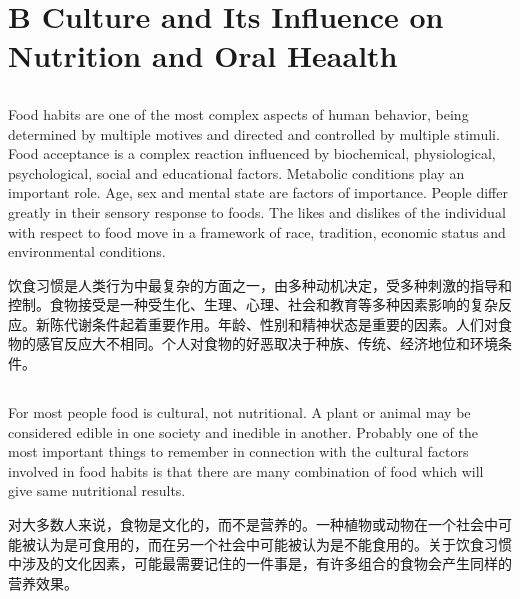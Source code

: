 \documentclass[]{article}
\begin{document}
\section{B Culture and Its Influence on Nutrition and Oral Heaalth}
\subsection{}
\begin{spacing}{2.0}
	{\Large Food habits are one of the most complex aspects of human behavior, being determined by multiple motives and directed and controlled by multiple stimuli. Food acceptance is a complex reaction influenced by biochemical, physiological, psychological, social and educational factors. Metabolic conditions play an important role. Age, sex and mental state are factors of importance. People differ greatly in their sensory response to foods. The likes and dislikes of the individual with respect to food move in a framework of race, tradition, economic status and environmental conditions.}\newline
\end{spacing}

饮食习惯是人类行为中最复杂的方面之一，由多种动机决定，受多种刺激的指导和控制。食物接受是一种受生化、生理、心理、社会和教育等多种因素影响的复杂反应。新陈代谢条件起着重要作用。年龄、性别和精神状态是重要的因素。人们对食物的感官反应大不相同。个人对食物的好恶取决于种族、传统、经济地位和环境条件。

\subsection{}
\begin{spacing}{2.0}
	{\Large For most people food is cultural, not nutritional. A plant or animal may be considered edible in one society and inedible in another. Probably one of the most important things to remember in connection with the cultural factors involved in food habits is that there are many combination of food which will give same nutritional results.}\newline
\end{spacing}

对大多数人来说，食物是文化的，而不是营养的。一种植物或动物在一个社会中可能被认为是可食用的，而在另一个社会中可能被认为是不能食用的。关于饮食习惯中涉及的文化因素，可能最需要记住的一件事是，有许多组合的食物会产生同样的营养效果。
\end{document}
